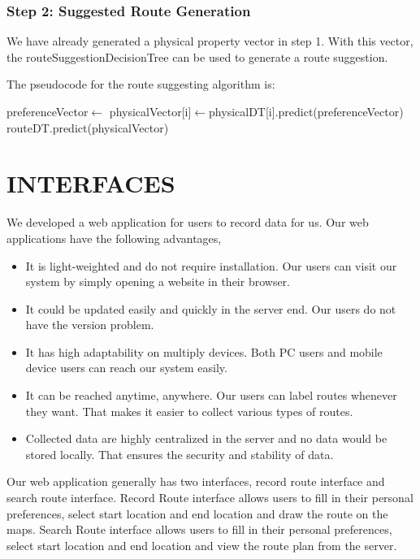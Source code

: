 \documentclass{sigchi}
\begin{document}
\subsubsection{Step 2: Suggested Route Generation}
We have already generated a physical property vector in step 1. With this vector, the routeSuggestionDecisionTree can be used to generate a route suggestion.

The pseudocode for the route suggesting algorithm is:
\begin{algorithmic}\footnotesize
    \State preferenceVector$\gets$
      \State physicalVector[i]$\gets$physicalDT[i].predict(preferenceVector) \EndFor
    \State \Return routeDT.predict(physicalVector)
  \EndFunction
\end{algorithmic}

\section{INTERFACES}
We developed a web application for users to record data for us. Our web applications have the following advantages,
\begin{itemize}
\item It is light-weighted and do not require installation. Our users can visit our system by simply opening a website in their browser.
\item It could be updated easily and quickly in the server end. Our users do not have the version problem.
\item It has high adaptability on multiply devices. Both PC users and mobile device users can reach our system easily.
\item It can be reached anytime, anywhere. Our users can label routes whenever they want. That makes it easier to collect various types of routes.
\item Collected data are highly centralized in the server and no data would be stored locally. That ensures the security and stability of data.
\end{itemize}
Our web application generally has two interfaces, record route interface and search route interface. Record Route interface allows users to fill in their personal preferences, select start location and end location and draw the route on the maps. Search Route interface allows users to fill in their personal preferences, select start location and end location and view the route plan from the server. 
\end{document}
